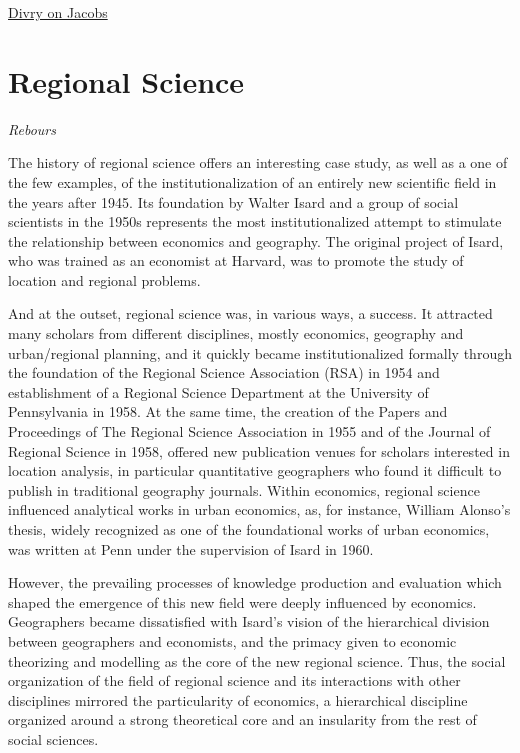 \documentclass[
]{book}
\begin{document}
\href{https://hscif.org/economists-in-the-city-divry/}{Divry on Jacobs}

\hypertarget{regional-science}{%
\section{Regional Science}\label{regional-science}}

\emph{Rebours}

The history of regional science offers an interesting case study, as well as a one of the few examples, of the institutionalization of an entirely new scientific field in the years after 1945. Its foundation by Walter Isard and a group of social scientists in the 1950s represents the most institutionalized attempt to stimulate the relationship between economics and geography. The original project of Isard, who was trained as an economist at Harvard, was to promote the study of location and regional problems.

And at the outset, regional science was, in various ways, a success. It attracted many scholars from different disciplines, mostly economics, geography and urban/regional planning, and it quickly became institutionalized formally through the foundation of the Regional Science Association (RSA) in 1954 and establishment of a Regional Science Department at the University of Pennsylvania in 1958. At the same time, the creation of the Papers and Proceedings of The Regional Science Association in 1955 and of the Journal of Regional Science in 1958, offered new publication venues for scholars interested in location analysis, in particular quantitative geographers who found it difficult to publish in traditional geography journals. Within economics, regional science influenced analytical works in urban economics, as, for instance, William Alonso's thesis, widely recognized as one of the foundational works of urban economics, was written at Penn under the supervision of Isard in 1960.

However, the prevailing processes of knowledge production and evaluation which shaped the emergence of this new field were deeply influenced by economics. Geographers became dissatisfied with Isard's vision of the hierarchical division between geographers and economists, and the primacy given to economic theorizing and modelling as the core of the new regional science. Thus, the social organization of the field of regional science and its interactions with other disciplines mirrored the particularity of economics, a hierarchical discipline organized around a strong theoretical core and an insularity from the rest of social sciences.
\end{document}
